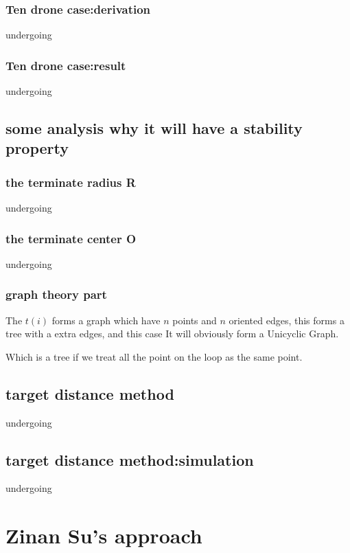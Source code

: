 \documentclass{article}
\theoremstyle{definition} %
\begin{document}
\subsubsection{Ten drone case:derivation}
undergoing

\subsubsection{Ten drone case:result}
undergoing

\subsection{some analysis why it will have a stability property}
\subsubsection{the terminate radius R}
undergoing

\subsubsection{the terminate center O}
undergoing

\subsubsection{graph theory part}
The \(t(i)\) forms a graph which have \(n\) points
and \(n\) oriented edges, this forms a tree with a extra
edges, and this case It will obviously form a Unicyclic Graph.

Which is a tree if we treat all the point on the
loop as the same point.

\subsection{target distance method}
undergoing

\subsection{target distance method:simulation}
undergoing

\section{Zinan Su's approach}
\end{document}
